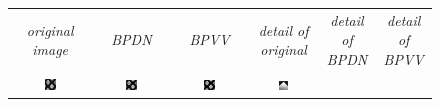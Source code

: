 \documentclass[twocolumn,twoside]{IEEEtran/IEEEtran}
\begin{document}
\noindent 
\begingroup \setlength{\tabcolsep}{1pt}
\begin{figure}[htbp]
  \centering
  \begin{tabular}{cccccc}
    \textit{\small original image} & \textit{\small BPDN} & \textit{\small BPVV} & \textit{\small detail of original} & \textit{\small detail of BPDN} & \textit{\small detail of BPVV} \\
    \includegraphics[width=0.16\textwidth]{figures-SBA/anothergrating_gt_framed}
                                   & \includegraphics[width=0.16\textwidth]{figures-SBA/anothergrating_40mu}		
                                                          & \includegraphics[width=0.16\textwidth]{figures-SBA/anothergrating_bptv_40mu}	
                                                                                 & \includegraphics[width=0.16\textwidth]{figures-SBA/anothergrating_gt_zoomin}	

\end{tabular}
\end{figure}
\end{document}
